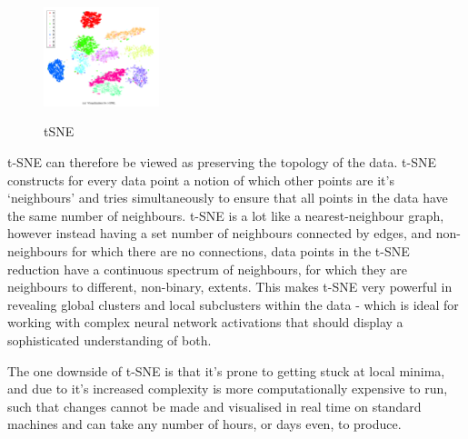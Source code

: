 \documentclass[a4paper,11pt,titlepage]{article}
\begin{document}
	\begin{figure}[H]
    			\centering	
			{{\includegraphics[width=0.3\textwidth]
    				{img/hinton_tsne.png} 
    			}}%
    			\caption{tSNE}%
    		\label{fig:3nn}
	\end{figure}	  
	
	
		t-SNE can therefore be viewed as preserving the topology of the data. t-SNE constructs for every data point a notion of which other points are it's `neighbours' and tries simultaneously to ensure that all points in the data have the same number of neighbours. t-SNE is a lot like a nearest-neighbour graph, however instead having a set number of neighbours connected by edges, and non-neighbours for which there are no connections, data points in the t-SNE reduction have a continuous spectrum of neighbours, for which they are neighbours to different, non-binary, extents. This makes t-SNE very powerful in revealing global clusters and local subclusters within the data - which is ideal for working with complex neural network activations that should display a sophisticated understanding of both.
		\par
		 The one downside of t-SNE is that it's prone to getting stuck at local minima, and due to it's increased complexity is more computationally expensive to run, such that changes cannot be made and visualised in real time on standard machines and can take any number of hours, or days even, to produce.  
\end{document}
